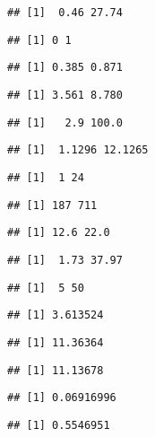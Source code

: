 \documentclass[
]{article}
\begin{document}
\begin{verbatim}
## [1]  0.46 27.74
\end{verbatim}

\begin{verbatim}
## [1] 0 1
\end{verbatim}

\begin{verbatim}
## [1] 0.385 0.871
\end{verbatim}

\begin{verbatim}
## [1] 3.561 8.780
\end{verbatim}

\begin{verbatim}
## [1]   2.9 100.0
\end{verbatim}

\begin{verbatim}
## [1]  1.1296 12.1265
\end{verbatim}

\begin{verbatim}
## [1]  1 24
\end{verbatim}

\begin{verbatim}
## [1] 187 711
\end{verbatim}

\begin{verbatim}
## [1] 12.6 22.0
\end{verbatim}

\begin{verbatim}
## [1]  1.73 37.97
\end{verbatim}

\begin{verbatim}
## [1]  5 50
\end{verbatim}

\begin{verbatim}
## [1] 3.613524
\end{verbatim}

\begin{verbatim}
## [1] 11.36364
\end{verbatim}

\begin{verbatim}
## [1] 11.13678
\end{verbatim}

\begin{verbatim}
## [1] 0.06916996
\end{verbatim}

\begin{verbatim}
## [1] 0.5546951
\end{verbatim}
\end{document}
